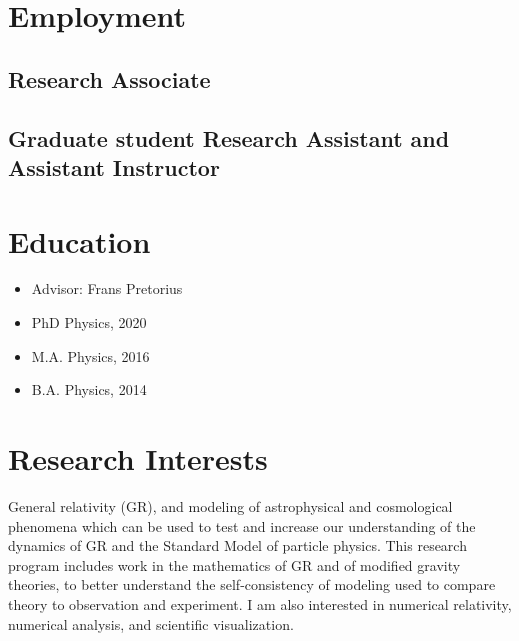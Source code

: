 \documentclass{my_cv}
\begin{document}
\bigskip
{}
\section{Employment}
\subsection{Research Associate}
\begin{itemize}
\end{itemize}
\subsection{Graduate student Research Assistant and Assistant Instructor}
\begin{itemize}
\end{itemize}
\section{Education}
\begin{itemize}
\item Advisor: Frans Pretorius
\item PhD  Physics, 2020 
\item M.A. Physics, 2016
\end{itemize}
\begin{itemize}
\item B.A. Physics, 2014
\end{itemize}
\section{Research Interests}
	General relativity (GR), and modeling of
astrophysical and cosmological phenomena which can be used
to test and increase our understanding of the dynamics of GR and the 
Standard Model of particle physics.
This research program includes work in
the mathematics of GR and of modified gravity theories, to better understand
the self-consistency of modeling used to compare theory to observation and
experiment.
I am also interested in numerical relativity, numerical analysis, and
scientific visualization.
\end{document}

